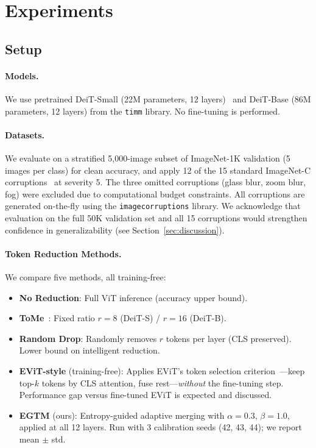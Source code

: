 \documentclass{article}
\newcommand{\ours}{EGTM}
\begin{document}
\section{Experiments}
\label{sec:experiments}

\subsection{Setup}

\paragraph{Models.}
We use pretrained DeiT-Small (22M parameters, 12 layers)~\citep{touvron2021training} and DeiT-Base (86M parameters, 12 layers) from the \texttt{timm} library. No fine-tuning is performed.

\paragraph{Datasets.}
We evaluate on a stratified 5,000-image subset of ImageNet-1K validation (5 images per class) for clean accuracy, and apply 12 of the 15 standard ImageNet-C corruptions~\citep{hendrycks2019benchmarking} at severity 5. The three omitted corruptions (glass blur, zoom blur, fog) were excluded due to computational budget constraints. All corruptions are generated on-the-fly using the \texttt{imagecorruptions} library. We acknowledge that evaluation on the full 50K validation set and all 15 corruptions would strengthen confidence in generalizability (see Section~\ref{sec:discussion}).

\paragraph{Token Reduction Methods.}
We compare five methods, all training-free:
\begin{itemize}
    \item \textbf{No Reduction}: Full ViT inference (accuracy upper bound).
    \item \textbf{ToMe}~\citep{bolya2023token}: Fixed ratio $r{=}8$ (DeiT-S) / $r{=}16$ (DeiT-B).
    \item \textbf{Random Drop}: Randomly removes $r$ tokens per layer (CLS preserved). Lower bound on intelligent reduction.
    \item \textbf{EViT-style} (training-free): Applies EViT's token selection criterion~\citep{liang2022evit}---keep top-$k$ tokens by CLS attention, fuse rest---\emph{without} the fine-tuning step. Performance gap versus fine-tuned EViT is expected and discussed.
    \item \textbf{\ours{}} (ours): Entropy-guided adaptive merging with $\alpha{=}0.3$, $\beta{=}1.0$, applied at all 12 layers. Run with 3 calibration seeds (42, 43, 44); we report mean $\pm$ std.
\end{itemize}
\end{document}
